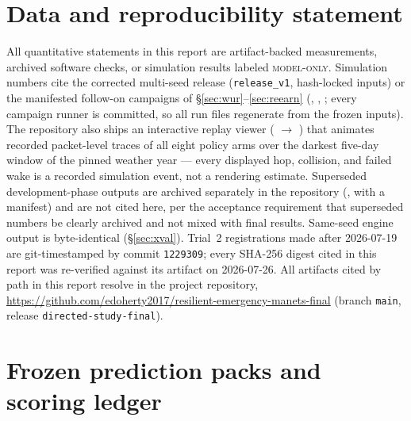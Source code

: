 \documentclass[11pt]{article}
\newcommand{\modelonly}{\textsc{model-only}}
\newcommand{\code}[1]{\texttt{\small #1}}
\begin{document}
\section{Data and reproducibility statement}\label{sec:repro}

All quantitative statements in this report are artifact-backed measurements,
archived software checks, or simulation results labeled \modelonly. Simulation
numbers cite the corrected multi-seed release (\code{release\_v1},
hash-locked inputs) or the manifested follow-on campaigns of
\S\ref{sec:wur}--\ref{sec:reearn}
(,
,
; every campaign runner is
committed, so all run files regenerate from the frozen inputs). The
repository also ships an interactive replay viewer
( $\to$
) that animates recorded packet-level
traces of all eight policy arms over the darkest five-day window of the
pinned weather year --- every displayed hop, collision, and failed wake is a
recorded simulation event, not a rendering estimate. Superseded
development-phase outputs are archived
separately in the repository (, with a manifest)
and are not cited here, per the acceptance requirement that superseded numbers
be clearly archived and not mixed with final results. Same-seed engine output
is byte-identical (\S\ref{sec:xval}). Trial~2 registrations made after
2026-07-19 are git-timestamped by commit \code{1229309}; every SHA-256 digest cited in
this report was re-verified against its artifact on 2026-07-26. All artifacts
cited by path in this report resolve in the project repository,
\url{https://github.com/edoherty2017/resilient-emergency-manets-final} (branch \code{main}, release \code{directed-study-final}).

\appendix

\section{Frozen prediction packs and scoring ledger}\label{app:packs}
\end{document}
